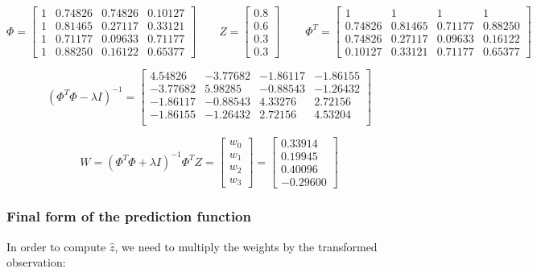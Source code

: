 \documentclass{article}
\begin{document}
\[ 
    \Phi = \begin{bmatrix}
    1 & 0.74826 & 0.74826 & 0.10127 \\
    1 & 0.81465 & 0.27117 & 0.33121 \\
    1 & 0.71177 & 0.09633 & 0.71177 \\
    1 & 0.88250 & 0.16122 & 0.65377
\end{bmatrix} 
\qquad 
Z = \begin{bmatrix} 0.8 \\ 0.6 \\ 0.3 \\ 0.3 \end{bmatrix} \
\qquad 
\Phi^T = \begin{bmatrix}
    1 & 1 & 1 & 1 \\
    0.74826 & 0.81465 & 0.71177 & 0.88250 \\
    0.74826 & 0.27117 & 0.09633 & 0.16122 \\
    0.10127 & 0.33121 & 0.71177 & 0.65377
\end{bmatrix} \]

\[ (\Phi^T \Phi - \lambda I)^{-1} = \begin{bmatrix}
    4.54826  & -3.77682 & -1.86117 & -1.86155 \\
    -3.77682 & 5.98285  & -0.88543 & -1.26432 \\
    -1.86117 & -0.88543 &  4.33276 &  2.72156 \\
    -1.86155 & -1.26432 &  2.72156 &  4.53204 \\
\end{bmatrix} \]

\[ W = (\Phi^T \Phi + \lambda I)^{-1} \Phi^T Z = \begin{bmatrix} w_0 \\ w_1 \\ w_2 \\ w_3 \end{bmatrix} = \begin{bmatrix} 0.33914 \\ 0.19945 \\ 0.40096 \\ -0.29600 \end{bmatrix} \]

\subsubsection*{Final form of the prediction function}

In order to compute $\hat{z}$, we need to multiply the weights by the transformed observation:
\end{document}
